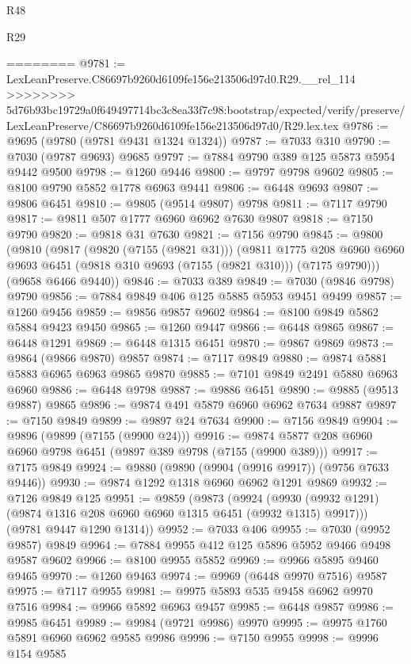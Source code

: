\begin{lexlean}{R48}
\begin{lexlean}{R29}
\begin{coremodule}
{{{{{{{{{{{{{{{{{{{{{{{{{{{{{{{{{{{{{{{{{{{{{{{{{{{{{{{{{{{{{{{{{{{{{{{{{{{{{{{{{{{{{{{{{{{{{{{{{{{{{{{{{{{{{{{{{{{{{{{{{{{{{{{{{{{{{{{{{{{{{{{{{{{{{{{{{{{{{{{{{{{{{{{{{{{{{{{{{{{{{{{{{{{{{{{{{{{{{{{{{{{{{{{{{{{{{{{{{{========
@9781 := LexLeanPreserve.C86697b9260d6109fe156e213506d97d0.R29.__rel_114
>>>>>>>> 5d76b93bc19729a0f649497714bc3c8ea33f7c98:bootstrap/expected/verify/preserve/LexLeanPreserve/C86697b9260d6109fe156e213506d97d0/R29.lex.tex
@9786 := @9695 (@9780 (@9781 @9431 @1324 @1324))
@9787 := @7033 @310
@9790 := @7030 (@9787 @9693) @9685
@9797 := @7884 @9790 @389 @125 @5873 @5954 @9442 @9500
@9798 := @1260 @9446
@9800 := @9797 @9798 @9602
@9805 := @8100 @9790 @5852 @1778 @6963 @9441
@9806 := @6448 @9693
@9807 := @9806 @6451
@9810 := @9805 (@9514 @9807) @9798
@9811 := @7117 @9790
@9817 := @9811 @507 @1777 @6960 @6962 @7630 @9807
@9818 := @7150 @9790
@9820 := @9818 @31 @7630
@9821 := @7156 @9790
@9845 := @9800
    (@9810
      (@9817
        (@9820 (@7155 (@9821 @31)))
        (@9811
          @1775
          @208
          @6960
          @6960
          @9693
          @6451
          (@9818 @310 @9693 (@7155 (@9821 @310)))
          (@7175 @9790)))
      (@9658 @6466 @9440))
@9846 := @7033 @389
@9849 := @7030 (@9846 @9798) @9790
@9856 := @7884 @9849 @406 @125 @5885 @5953 @9451 @9499
@9857 := @1260 @9456
@9859 := @9856 @9857 @9602
@9864 := @8100 @9849 @5862 @5884 @9423 @9450
@9865 := @1260 @9447
@9866 := @6448 @9865
@9867 := @6448 @1291
@9869 := @6448 @1315 @6451
@9870 := @9867 @9869
@9873 := @9864 (@9866 @9870) @9857
@9874 := @7117 @9849
@9880 := @9874 @5881 @5883 @6965 @6963 @9865 @9870
@9885 := @7101 @9849 @2491 @5880 @6963 @6960
@9886 := @6448 @9798
@9887 := @9886 @6451
@9890 := @9885 (@9513 @9887) @9865
@9896 := @9874 @491 @5879 @6960 @6962 @7634 @9887
@9897 := @7150 @9849
@9899 := @9897 @24 @7634
@9900 := @7156 @9849
@9904 := @9896 (@9899 (@7155 (@9900 @24)))
@9916 := @9874 @5877 @208 @6960 @6960 @9798 @6451 (@9897 @389 @9798 (@7155 (@9900 @389)))
@9917 := @7175 @9849
@9924 := @9880 (@9890 (@9904 (@9916 @9917)) (@9756 @7633 @9446))
@9930 := @9874 @1292 @1318 @6960 @6962 @1291 @9869
@9932 := @7126 @9849 @125
@9951 := @9859
    (@9873
      (@9924 (@9930 (@9932 @1291) (@9874 @1316 @208 @6960 @6960 @1315 @6451 (@9932 @1315) @9917)))
      (@9781 @9447 @1290 @1314))
@9952 := @7033 @406
@9955 := @7030 (@9952 @9857) @9849
@9964 := @7884 @9955 @412 @125 @5896 @5952 @9466 @9498 @9587 @9602
@9966 := @8100 @9955 @5852
@9969 := @9966 @5895 @9460 @9465
@9970 := @1260 @9463
@9974 := @9969 (@6448 @9970 @7516) @9587
@9975 := @7117 @9955
@9981 := @9975 @5893 @535 @9458 @6962 @9970 @7516
@9984 := @9966 @5892 @6963 @9457
@9985 := @6448 @9857
@9986 := @9985 @6451
@9989 := @9984 (@9721 @9986) @9970
@9995 := @9975 @1760 @5891 @6960 @6962 @9585 @9986
@9996 := @7150 @9955
@9998 := @9996 @154 @9585
}}}}}}}}}}}}}}}}}}}}}}}}}}}}}}}}}}}}}}}}}}}}}}}}}}}}}}}}}}}}}}}}}}}}}}}}}}}}}}}}}}}}}}}}}}}}}}}}}}}}}}}}}}}}}}}}}}}}}}}}}}}}}}}}}}}}}}}}}}}}}}}}}}}}}}}}}}}}}}}}}}}}}}}}}}}}}}}}}}}}}}}}}}}}}}}}}}}}}}}}}}}}}}}}}}}}}}}}}}
\end{coremodule}
\end{lexlean}
\end{lexlean}
